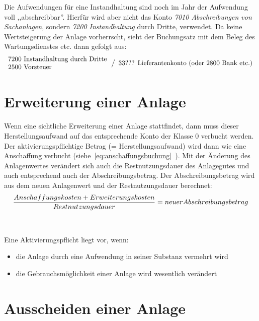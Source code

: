 \documentclass[a4paper,10pt]{report}
\begin{document}
Die Aufwendungen für eine Instandhaltung sind noch im Jahr der
Aufwendung voll ,,abschreibbar''. Hierfür wird aber nicht das Konto
\textit{7010 Abschreibungen von Sachanlagen}, sondern \textit{7200
Instandhaltung} durch Dritte, verwendet. Da keine Wertsteigerung der
Anlage vorherrscht, sieht der Buchungsatz mit dem Beleg des
Wartungsdienstes etc. dann gefolgt aus:
\begin{equation*}
  \begin{array}{l}
    \text{7200 Instandhaltung durch
Dritte}\\
     \text{2500 Vorsteuer}\\
  \end{array}
  \left\slash
    \begin{array}{l}
      \text{33??? Lieferantenkonto (oder 2800 Bank etc.)}\\
    \end{array}
  \right.
\end{equation*}

\chapter{Erweiterung einer Anlage}
\thispagestyle{fancy}
Wenn eine sichtliche Erweiterung einer Anlage stattfindet, dann muss
dieser Herstellungsaufwand auf das entsprechende Konto der Klasse 0
verbucht werden. Der aktivierungspflichtige Betrag (=
Herstellungsaufwand) wird dann wie eine Anschaffung verbucht
(siehe~\autoref{eq:anschaffungsbuchung}~). Mit
der Änderung des Anlagenwertes verändert sich auch die
Restnutzungsdauer des Anlagegutes und auch entsprechend auch der
Abschreibungsbetrag. Der Abschreibungsbetrag wird aus dem neuen
Anlagenwert und der Restnutzungsdauer berechnet:
\begin{equation}
  { {Anschaffungskosten + Erweiterungskosten } \over Restnutzungsdauer
  } = neuer Abschreibungsbetrag
  \end{equation}
\\\\
Eine Aktivierungspflicht liegt vor, wenn:
\begin{itemize}
  \item die Anlage durch eine Aufwendung in seiner Substanz vermehrt wird
  \item die Gebrauchsmöglichkeit einer Anlage wird wesentlich verändert
\end{itemize}

\chapter{Ausscheiden einer Anlage}
\thispagestyle{fancy}
\end{document}

